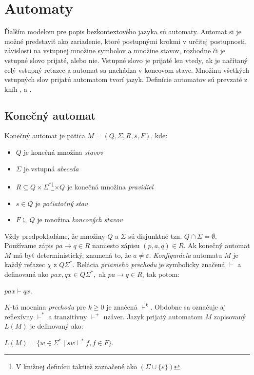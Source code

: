 \chapter{Automaty}
Ďalším modelom pre popis bezkontextového jazyka sú automaty. Automat si je možné predstaviť ako zariadenie, ktoré postupnými krokmi v určitej postupnosti, závislosti na vstupnej množine symbolov a množine stavov, rozhodne či je vstupné slovo prijaté, alebo nie. Vstupné slovo je prijaté len vtedy, ak je načítaný celý vstupný reťazec a automat sa nachádza v koncovom stave. Množinu všetkých vstupných slov prijatú automatom tvorí jazyk. Definície automatov sú prevzaté z kníh \cite{Automata}, \cite{Automata2} a \cite{Reggram}.

\section{Konečný automat}
\label{konauto}
Konečný automat je pätica $M = (Q, \Sigma, R, s, F)$, kde:
\begin{itemize}
\item $Q$ je konečná množina \textit{stavov}
\item $\Sigma$ je vstupná \textit{abeceda}
\item $R \subseteq Q \times \Sigma^\ast$\footnote{V knižnej definícii taktiež zaznačené ako $(\Sigma \cup \{\varepsilon\})$}$ \times Q$ je konečná množina \textit{pravidiel}
\item $s \in Q$ je \textit{počiatočný stav}
\item $F \subseteq Q$ je množina \textit{koncových stavov}
\end{itemize} 

Vždy predpokladáme, že množiny $Q$ a $\Sigma$ sú disjunktné tzn. $Q \cap \Sigma = \emptyset$. Používame zápis $pa \to q \in R$ namiesto zápisu $(p, a, q) \in R$. Ak konečný automat $M$ má byť deterministický, znamená to, že $a \neq \varepsilon$. \textit{Konfigurácia} automatu $M$ je každý reťazec $\chi$ z $Q\Sigma^\ast$. Relácia \textit{priameho prechodu} je symbolicky značená $\vdash$ a definovaná ako $pax, qx \in Q\Sigma^\ast, $ ak $ pa \to q \in R$, tak potom:
\begin{center}
$pax \vdash qx$.
\end{center}

$K$-tá mocnina \textit{prechodu} pre $k \geq 0$ je značená $\vdash^k$. Obdobne sa označuje aj reflexívny $\vdash^\ast$ a tranzitívny $\vdash^+$ uzáver. Jazyk prijatý automatom $M$ zapisovaný $L(M)$ je definovaný ako: 
\begin{center}
$L(M) = \{w \in \Sigma^\ast \mid sw \vdash^\ast f, f \in F\}$.
\end{center}

